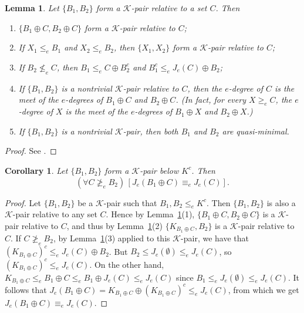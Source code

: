 \documentclass[11pt]{amsart}
\newtheorem{lemma}[theorem]{Lemma}
\newtheorem{corollary}[theorem]{Corollary}
\newcommand{\QA}[1]{(\forall{#1})\,}
\begin{document}
\begin{lemma}\label{lem:Kprinc}
Let $\{B_1, B_2\}$ form a $\mathcal{K}$-pair relative to a set $C$. Then 
\begin{enumerate}
  
  \item $\{B_1\oplus C, B_2 \oplus C\}$ form a $\mathcal{K}$-pair relative 
      to $C$; 
  
  \item If $X_1 \leq_e B_1$ and $X_2 \leq_e B_2$, then $\{X_1, X_2\}$ form 
      a $\mathcal{K}$-pair relative to $C$; 
  
  \item If $B_2 \nleq_e C$, then $B_1 \leq_e C \oplus B_2^c$ and  $B_1^c 
      \le_e J_e(C) \oplus B_2$; 
  
  \item If $\{B_1, B_2\}$ is a nontrivial $\mathcal{K}$-pair relative to 
      $C$, then the $e$-degree of $C$ is the meet of the $e$-degrees of $B_1 
      \oplus C$ and $B_2 \oplus C$. (In fact, for every $X\geq_e C$, the 
      $e$-degree of $X$ is the meet of the $e$-degrees of $B_1 \oplus X$ 
      and $B_2 \oplus X$.)  
      
  \item If $\{B_1, B_2\}$ is a nontrivial $\mathcal{K}$-pair, then both 
      $B_1$ and $B_2$ are quasi-minimal.  
\end{enumerate}
\end{lemma}

\begin{proof}
See \cite{Kalimullin}.
\end{proof}

\begin{corollary}\label{cor:Kprinc}
Let $\{B_1, B_2\}$ form a $\mathcal{K}$-pair below $K^c$. Then 
\[
\QA{C \ngeq_e B_2}[J_e(B_1 \oplus C)\equiv_e J_e(C)].
\] 
\end{corollary}

\begin{proof}
Let $\{B_1, B_2\}$ be a $\mathcal{K}$-pair such that $B_1, B_2 \leq_e K^c$. 
Then $\{B_1, B_2\}$ is also a $\mathcal{K}$-pair relative to any set $C$. 
Hence by Lemma~\ref{lem:Kprinc}(1), $\{B_1\oplus C, B_2 \oplus C\}$ is a 
$\mathcal{K}$-pair relative to $C$, and thus by Lemma~\ref{lem:Kprinc}(2)  
$\{K_{B_1\oplus C}, B_2\}$ is a $\mathcal{K}$-pair relative to $C$. If $C 
\ngeq_e B_2$, by Lemma~\ref{lem:Kprinc}(3) applied to this 
$\mathcal{K}$-pair, we have that $\left( K_{B_1 \oplus C}\right)^c \leq_e 
J_e(C) \oplus B_2$. But $B_2  \leq J_e(\emptyset) \leq_e J_e(C)$, so $\left( 
K_{B_1 \oplus C}\right)^c \leq_e J_e(C)$. On the other hand, $K_{B_1 \oplus 
C} \leq_e B_1 \oplus C \leq_e B_1 \oplus J_e(C) \leq_e J_e(C)$ since $B_1  
\leq_e J_e(\emptyset) \leq_e J_e(C)$. It follows that $J_e(B_1 \oplus 
C)=K_{B_1 \oplus C}\oplus \left( K_{B_1 \oplus C}\right)^c\leq_e J_e(C)$, 
from which we get $J_e(B_1 \oplus C)\equiv_e J_e(C)$. 
\end{proof}
\end{document}
